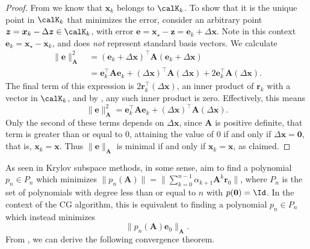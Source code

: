 \begin{proof}
    From  we know that $\bm{x}_{k}$ belongs to $\calK_{k}$. To show that it is the unique point in $\calK_{k}$ that minimizes the error, consider an arbitrary point $\bm{z} = \bm{x}_k - \Delta \bm{z} \in \calK_{k}$, with error $\bm{e} = \bm{x}_{\star} - \bm{z} = \bm{e}_{k} + \Delta \bm{x}$. Note in this context $\bm{e}_{k} = \bm{x}_{\star} - \bm{x}_{k}$, and does {\it not} represent standard basis vectors. We calculate
    \begin{align*}
        \| \bm{e} \|_{\bm{A}}^2 \
         & = \left( \bm{e}_{k} + \Delta \bm{x} \right)^{\intercal} \bm{A} \left( \bm{e}_{k} + \Delta \bm{x} \right)                                                                                  \\
         & = \bm{e}_{k}^{\intercal} \bm{A} \bm{e}_{k} + \left( \Delta \bm{x} \right)^{\intercal} \bm{A} \left( \Delta \bm{x} \right) + 2 \bm{e}_{k}^{\intercal} \bm{A} \left( \Delta \bm{x} \right).
    \end{align*}
    The final term of this expression is $2 \bm{r}_{k}^{\intercal} \left( \Delta \bm{x} \right)$, an inner product of $\bm{r}_{k}$ with a vector in $\calK_k$, and by , any such inner product is zero. Effectively, this means
    \[
        \| \bm{e} \|_{\bm{A}}^{2} = \bm{e}_{k}^{\intercal} \bm{A} \bm{e}_{k} + \left( \Delta \bm{x} \right)^{\intercal} \bm{A} \left( \Delta \bm{x} \right).
    \]
    Only the second of these terms depends on $\Delta \bm{x}$, since $\bm{A}$ is positive definite, that term is greater than or equal to $0$, attaining the value of $0$ if and only if $\Delta \bm{x} = \bm{0}$, that is, $\bm{x}_k = \bm{x}$. Thus $\| \bm{e} \|_{\bm{A}}$ is minimal if and only if $\bm{x}_{k} = \bm{x}$, as claimed.
\end{proof}

As seen in  Krylov subspace methods, in some sense, aim to find a polynomial $p_n \in P_n$ which minimizes $\| p_n \left( \bm{A} \right) \| = \| \sum_{k=0}^{n-1} \alpha_{k + 1} \bm{A}^{k} \bm{r}_{0} \|$, where $P_n$ is the set of polynomials with degree less than or equal to $n$ with $p(\bm{0}) = \Id$. In the context of the CG algorithm, this is equivalent to finding a polynomial $p_n \in P_n$ which instead minimizes
\begin{equation} \label{eq: CG-poly-min}
    \| p_n \left( \bm{A} \right) \bm{e}_{0} \|_{\bm{A}}.
\end{equation}
From , we can derive the following convergence theorem.

